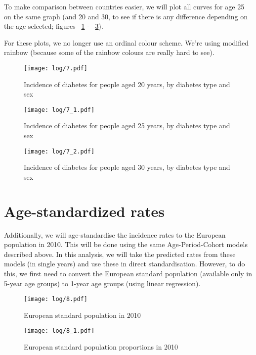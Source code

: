 \documentclass[11pt]{article}
\begin{document}
To make comparison between countries easier, we will plot all curves for age 25 on the same graph 
(and 20 and 30, to see if there is any difference depending on the age selected; figures ~\ref{agespec20} - ~\ref{agespec30}).

For these plots, we no longer use an ordinal colour scheme. We're using modified rainbow 
(because some of the rainbow colours are really hard to see).

\color{Blue4}
\begin{stlog}\end{stlog}
\begin{figure}
    \centering
    \texttt{[image: log/7.pdf]}
    \caption{Incidence of diabetes for people aged 20 years, by diabetes type and sex}
    \label{agespec20}
\end{figure}
\begin{figure}
    \centering
    \texttt{[image: log/7\_1.pdf]}
    \caption{Incidence of diabetes for people aged 25 years, by diabetes type and sex}
    \label{agespec25}
\end{figure}
\begin{figure}
    \centering
    \texttt{[image: log/7\_2.pdf]}
    \caption{Incidence of diabetes for people aged 30 years, by diabetes type and sex}
    \label{agespec30}
\end{figure}
\begin{stlog}\end{stlog}
\color{black}

\clearpage
\section{Age-standardized rates}


Additionally, we will age-standardise the incidence rates to the European population in 2010. 
This will be done using the same Age-Period-Cohort models described above. In this analysis, we will take
the predicted rates from these models (in single years) and use these in direct standardisation. However,
to do this, we first need to convert the European standard population (available only in 5-year age groups)
to 1-year age groups (using linear regression).

\color{Blue4}
\begin{figure}
    \centering
    \texttt{[image: log/8.pdf]}
    \caption{European standard population in 2010}
    \label{ESP2010N}
\end{figure}
\begin{figure}
    \centering
    \texttt{[image: log/8\_1.pdf]}
    \caption{European standard population proportions in 2010}
    \label{ESP2010P}
\end{figure}
\begin{stlog}\end{stlog}
\color{black}
\end{document}

